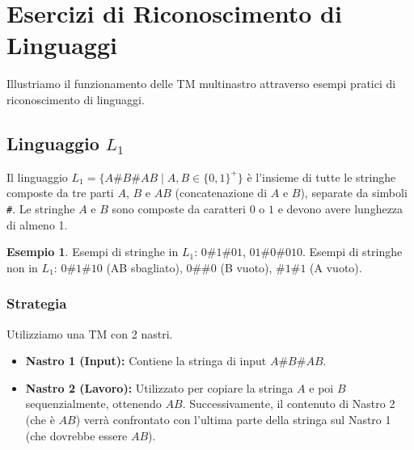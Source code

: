 \documentclass[a4paper]{article}
\theoremstyle{definition} %
\newtheorem{example}{Esempio}
\begin{document}
\section{Esercizi di Riconoscimento di Linguaggi}
Illustriamo il funzionamento delle TM multinastro attraverso esempi pratici di riconoscimento di linguaggi.

\subsection{Linguaggio $L_1$}
Il linguaggio $L_1 = \{A\#B\#AB \mid A,B \in \{0,1\}^+\}$ è l'insieme di tutte le stringhe composte da tre parti $A$, $B$ e $AB$ (concatenazione di $A$ e $B$), separate da simboli \texttt{\#}. Le stringhe $A$ e $B$ sono composte da caratteri $0$ o $1$ e devono avere lunghezza di almeno 1.
\begin{example}
Esempi di stringhe in $L_1$: $0\texttt{\#}1\texttt{\#}01$, $01\texttt{\#}0\texttt{\#}010$.
Esempi di stringhe non in $L_1$: $0\texttt{\#}1\texttt{\#}10$ (AB sbagliato), $0\texttt{\#}\texttt{\#}0$ (B vuoto), $\texttt{\#}1\texttt{\#}1$ (A vuoto).
\end{example}

\subsubsection{Strategia}
Utilizziamo una TM con 2 nastri.
\begin{itemize}
    \item \textbf{Nastro 1 (Input):} Contiene la stringa di input $A\#B\#AB$.
    \item \textbf{Nastro 2 (Lavoro):} Utilizzato per copiare la stringa $A$ e poi $B$ sequenzialmente, ottenendo $AB$. Successivamente, il contenuto di Nastro 2 (che è $AB$) verrà confrontato con l'ultima parte della stringa sul Nastro 1 (che dovrebbe essere $AB$).
\end{itemize}
\end{document}
